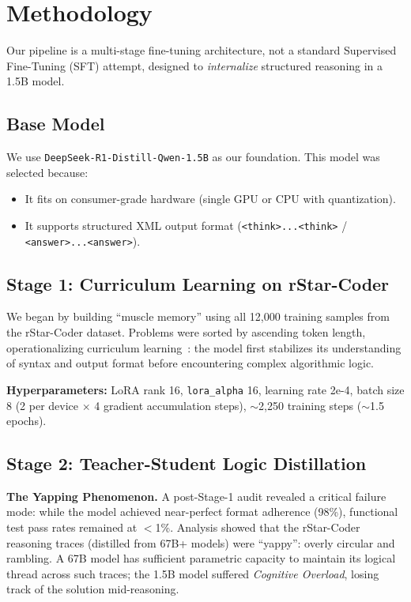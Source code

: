 \documentclass[preprint,12pt]{elsarticle}
\begin{document}
\section{Methodology}
\label{sec:method}

Our pipeline is a multi-stage fine-tuning architecture, not a standard Supervised Fine-Tuning (SFT) attempt, designed to \textit{internalize} structured reasoning in a 1.5B model.

\subsection{Base Model}

We use \texttt{DeepSeek-R1-Distill-Qwen-1.5B} as our foundation. This model was selected because:
\begin{itemize}
    \item It fits on consumer-grade hardware (single GPU or CPU with quantization).
    \item It supports structured XML output format (\texttt{<think>...<\/think>} / \texttt{<answer>...<\/answer>}).
\end{itemize}

\subsection{Stage 1: Curriculum Learning on rStar-Coder}

We began by building ``muscle memory'' using all 12,000 training samples from the rStar-Coder dataset. Problems were sorted by ascending token length, operationalizing curriculum learning~\cite{bengio2009curriculum}: the model first stabilizes its understanding of syntax and output format before encountering complex algorithmic logic.

\textbf{Hyperparameters:} LoRA rank 16, \texttt{lora\_alpha} 16, learning rate 2e-4, batch size 8 (2 per device $\times$ 4 gradient accumulation steps), $\sim$2,250 training steps ($\sim$1.5 epochs).

\subsection{Stage 2: Teacher-Student Logic Distillation}
\label{sec:yapping}

\textbf{The Yapping Phenomenon.} A post-Stage-1 audit revealed a critical failure mode: while the model achieved near-perfect format adherence (98\%), functional test pass rates remained at $<$1\%. Analysis showed that the rStar-Coder reasoning traces (distilled from 67B+ models) were ``yappy'': overly circular and rambling. A 67B model has sufficient parametric capacity to maintain its logical thread across such traces; the 1.5B model suffered \textit{Cognitive Overload}, losing track of the solution mid-reasoning.
\end{document}
